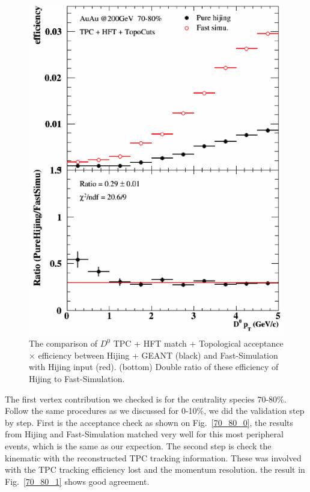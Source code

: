 \begin{figure}[htbp]
\begin{minipage}[htbp]{0.47\linewidth}
\includegraphics[width=1.0\textwidth,angle=0]{figure/Run14_D0HFT/70_80.png} 
\caption{ The comparison of $D^0$ TPC + HFT match + Topological acceptance $\times$ efficiency between Hijing + GEANT (black) and Fast-Simulation with Hijing input (red). (bottom) Double ratio of these efficiency of Hijing to Fast-Simulation.\label{70_80_3}}
\end{minipage}
\end{figure}

The first vertex contribution we checked is for the centrality species 70-80\%. Follow the same procedures as we discussed for 0-10\%, we did the validation step by step. First is the acceptance check as shown on Fig.~\ref{70_80_0}, the results from Hijing and Fast-Simulation matched very well for this most peripheral events, which is the same as our expection. The second step is check the kinematic with the reconstructed TPC tracking information. These was involved with the TPC tracking efficiency lost and the momentum resolution. the result in Fig.~\ref{70_80_1} shows good agreement.

